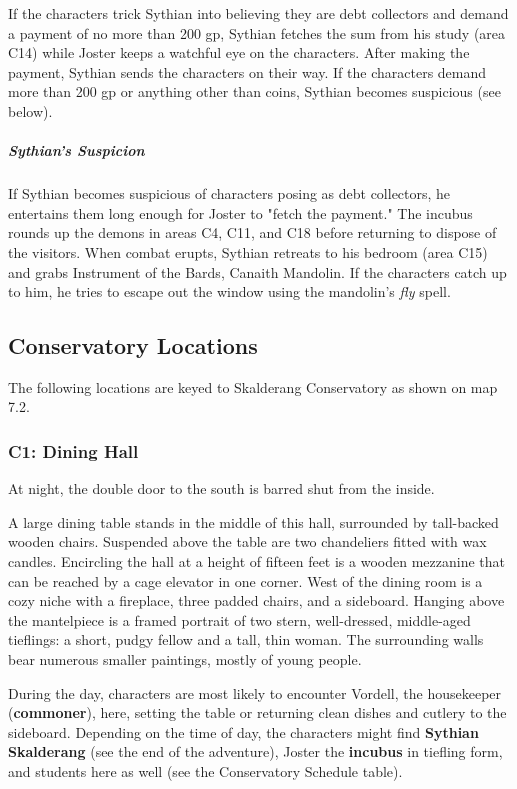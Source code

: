 \documentclass[10pt,a4paper,twoside,bg=print,twocolumn,openany,nodeprecatedcode]{dndbook}
\begin{document}
If the characters trick Sythian into believing they are debt collectors and demand a payment of no more than 200 gp, Sythian fetches the sum from his study (area C14) while Joster keeps a watchful eye on the characters. After making the payment, Sythian sends the characters on their way. If the characters demand more than 200 gp or anything other than coins, Sythian becomes suspicious (see below).

\subparagraph{Sythian's Suspicion}
If Sythian becomes suspicious of characters posing as debt collectors, he entertains them long enough for Joster to "fetch the payment." The incubus rounds up the demons in areas C4, C11, and C18 before returning to dispose of the visitors. When combat erupts, Sythian retreats to his bedroom (area C15) and grabs Instrument of the Bards, Canaith Mandolin. If the characters catch up to him, he tries to escape out the window using the mandolin's \textit{fly} spell.

\subsection{Conservatory Locations}
The following locations are keyed to Skalderang Conservatory as shown on map 7.2.

\subsubsection{C1: Dining Hall}
At night, the double door to the south is barred shut from the inside.

\begin{DndReadAloud}{}
A large dining table stands in the middle of this hall, surrounded by tall-backed wooden chairs. Suspended above the table are two chandeliers fitted with wax candles. Encircling the hall at a height of fifteen feet is a wooden mezzanine that can be reached by a cage elevator in one corner. West of the dining room is a cozy niche with a fireplace, three padded chairs, and a sideboard. Hanging above the mantelpiece is a framed portrait of two stern, well-dressed, middle-aged tieflings: a short, pudgy fellow and a tall, thin woman. The surrounding walls bear numerous smaller paintings, mostly of young people.

\end{DndReadAloud}

During the day, characters are most likely to encounter Vordell, the housekeeper (\textbf{commoner}), here, setting the table or returning clean dishes and cutlery to the sideboard. Depending on the time of day, the characters might find \textbf{Sythian Skalderang} (see the end of the adventure), Joster the \textbf{incubus} in tiefling form, and students here as well (see the Conservatory Schedule table).
\end{document}
